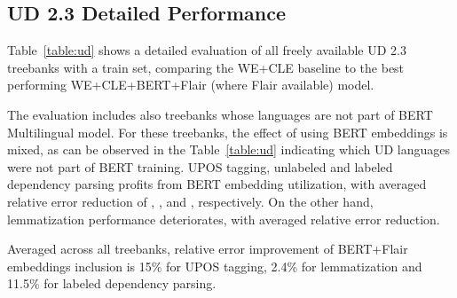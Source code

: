 \documentclass[11pt,a4paper]{article}
\begin{document}
\subsection{UD 2.3 Detailed Performance}

Table~\ref{table:ud} shows a detailed evaluation of all  freely available
UD 2.3 treebanks with a train set, comparing the WE+CLE baseline to the best
performing WE+CLE+BERT+Flair (where Flair available) model.

The evaluation includes also  treebanks whose languages are not part of BERT
Multilingual model. For these treebanks, the effect of using BERT embeddings
is mixed, as can be observed in the Table~\ref{table:ud} indicating which
UD languages were not part of BERT training. UPOS tagging, unlabeled and
labeled dependency parsing profits from BERT embedding utilization, with
averaged relative error reduction of , , and , respectively.
On the other hand, lemmatization performance deteriorates, with 
averaged relative error reduction.

Averaged across all
treebanks, relative error improvement of BERT+Flair embeddings inclusion is
15\% for UPOS tagging, 2.4\% for lemmatization and 11.5\% for labeled
dependency parsing.
\end{document}
